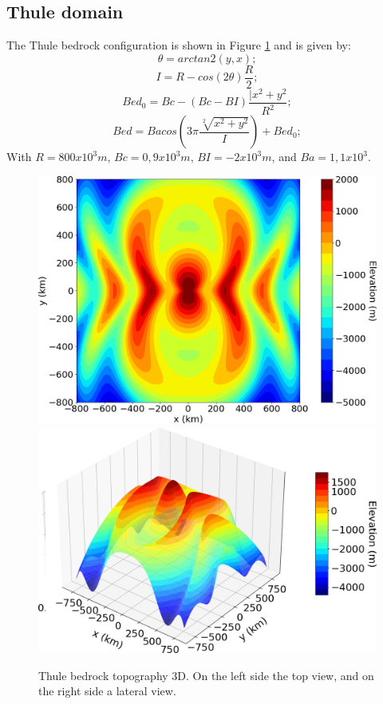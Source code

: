 \documentclass{article}
\begin{document}
\subsection{Thule domain}
The Thule bedrock configuration is shown in Figure \ref{Thule_3D} and is given by:
\begin{equation}
	\theta=arctan2(y,x);
\end{equation}
\begin{equation}
	I=R-cos(2\theta)\frac{R}{2};
\end{equation}
\begin{equation}
	Bed_0=Bc-(Bc-BI)\frac{|x^2+y^2}{R^2};
\end{equation}
\begin{equation}
	Bed=Bacos(3\pi\frac{\sqrt[2]{x^2+y^2}}{I})+Bed_0;
\end{equation}
With $R=800 x 10^3 m$, $Bc=0,9 x 10^3 m$, $BI=-2 x 10^3 m$, and $Ba=1,1 x 10^3$.
\begin{figure}[!h]
	\centering
	\includegraphics[width=0.45\linewidth]{../fig/Thule_2D}
	\includegraphics[width=0.45\linewidth]{../fig/Thule_3D}
	\caption{Thule bedrock topography 3D. On the left side the top view, and on the right side a lateral view.}
	\label{Thule_3D}
\end{figure}
\end{document}
